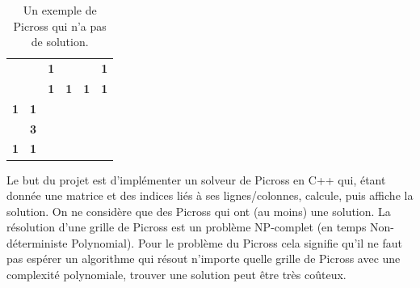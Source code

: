 \documentclass{article}
\begin{document}
\begin{table}[h]
\centering
\begin{tabular}{cccccc}
                   &                                 & \textbf{1}                                                           & \textbf{}                                     & \textbf{}                                     & \textbf{1}                                                           \\
                   & \textbf{}                       & \textbf{1}                                                           & \textbf{1}                                    & \textbf{1}                                    & \textbf{1}                                                           \\ \cline{3-6} 
\textbf{1}         & \multicolumn{1}{c|}{\textbf{1}} & \multicolumn{1}{c|}{\cellcolor[HTML]{000000}}                        & \multicolumn{1}{c|}{}                         & \multicolumn{1}{c|}{}                         & \multicolumn{1}{c|}{\cellcolor[HTML]{000000}}                        \\ \cline{3-6} 
\textit{\textbf{}} & \multicolumn{1}{c|}{\textbf{3}} & \multicolumn{1}{c|}{\cellcolor[HTML]{C0C0C0}{\color[HTML]{9B9B9B} }} & \multicolumn{1}{c|}{\cellcolor[HTML]{000000}} & \multicolumn{1}{c|}{\cellcolor[HTML]{000000}} & \multicolumn{1}{c|}{\cellcolor[HTML]{C0C0C0}{\color[HTML]{9B9B9B} }} \\ \cline{3-6} 
\textbf{1}         & \multicolumn{1}{c|}{\textbf{1}} & \multicolumn{1}{c|}{\cellcolor[HTML]{000000}}                        & \multicolumn{1}{c|}{}                         & \multicolumn{1}{c|}{}                         & \multicolumn{1}{c|}{\cellcolor[HTML]{000000}}                        \\ \cline{3-6} 
\end{tabular}
\caption{Un exemple de Picross qui n'a pas de solution.}
\end{table}
\newpage


Le but du projet est d'implémenter un solveur de Picross en C++ qui, étant donnée une matrice et des indices liés à ses lignes/colonnes, calcule, puis affiche la solution. On ne considère que des Picross qui ont (au moins) une solution.\newline
La résolution d'une grille de Picross est un problème NP-complet (en temps Non-déterministe Polynomial). Pour le problème du Picross cela signifie qu'il ne faut pas espérer un algorithme qui résout n'importe quelle grille de Picross avec une complexité polynomiale, trouver une solution peut être très coûteux.
\end{document}
